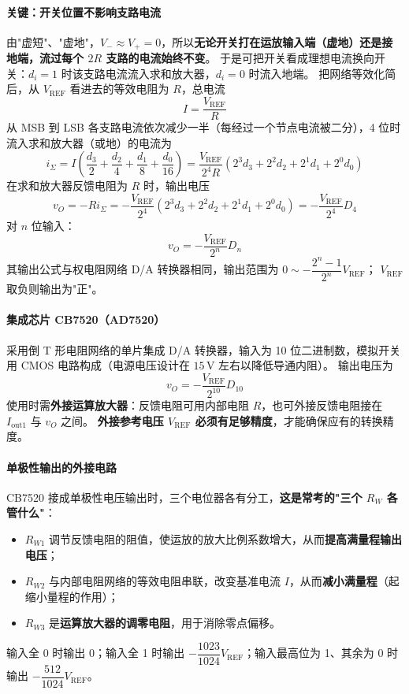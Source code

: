 \paragraph{关键：开关位置不影响支路电流}
由"虚短"、"虚地"，$V_-\approx V_+=0$，所以\textbf{无论开关打在运放输入端（虚地）还是接地端，流过每个 $2R$ 支路的电流始终不变}。
于是可把开关看成理想电流换向开关：$d_i=1$ 时该支路电流流入求和放大器，$d_i=0$ 时流入地端。
把网络等效化简后，从 $V_\text{REF}$ 看进去的等效电阻为 $R$，总电流
\[
I=\frac{V_\text{REF}}{R}
\]
从 MSB 到 LSB 各支路电流依次减少一半（每经过一个节点电流被二分），4 位时流入求和放大器（或地）的电流为
\[
i_\Sigma=I\left(\frac{d_3}{2}+\frac{d_2}{4}+\frac{d_1}{8}+\frac{d_0}{16}\right)
=\frac{V_\text{REF}}{2^4R}\left(2^3d_3+2^2d_2+2^1d_1+2^0d_0\right)
\]
在求和放大器反馈电阻为 $R$ 时，输出电压
\[
v_O=-Ri_\Sigma=-\frac{V_\text{REF}}{2^4}\left(2^3d_3+2^2d_2+2^1d_1+2^0d_0\right)
=-\frac{V_\text{REF}}{2^4}D_4
\]
对 $n$ 位输入：
\[
v_O=-\frac{V_\text{REF}}{2^n}D_n
\]
其输出公式与权电阻网络 D/A 转换器相同，输出范围为 $0\sim-\dfrac{2^n-1}{2^n}V_\text{REF}$；
$V_\text{REF}$ 取负则输出为"正"。

\paragraph{集成芯片 CB7520（AD7520）}
采用倒 T 形电阻网络的单片集成 D/A 转换器，输入为 10 位二进制数，模拟开关用 CMOS 电路构成（电源电压设计在 $15\,\mathrm{V}$ 左右以降低导通内阻）。
输出电压为
\[
v_O=-\frac{V_\text{REF}}{2^{10}}D_{10}
\]
使用时需\textbf{外接运算放大器}：反馈电阻可用内部电阻 $R$，也可外接反馈电阻接在 $I_\text{out1}$ 与 $v_O$ 之间。
\textbf{外接参考电压 $V_\text{REF}$ 必须有足够精度}，才能确保应有的转换精度。

\paragraph{单极性输出的外接电路}
CB7520 接成单极性电压输出时，三个电位器各有分工，\textbf{这是常考的"三个 $R_W$ 各管什么"}：
\begin{itemize}
    \item $R_{W1}$ 调节反馈电阻的阻值，使运放的放大比例系数增大，从而\textbf{提高满量程输出电压}；
    \item $R_{W2}$ 与内部电阻网络的等效电阻串联，改变基准电流 $I$，从而\textbf{减小满量程}（起缩小量程的作用）；
    \item $R_{W3}$ 是\textbf{运算放大器的调零电阻}，用于消除零点偏移。
\end{itemize}
输入全 0 时输出 0；输入全 1 时输出 $-\dfrac{1023}{1024}V_\text{REF}$；输入最高位为 1、其余为 0 时输出 $-\dfrac{512}{1024}V_\text{REF}$。

